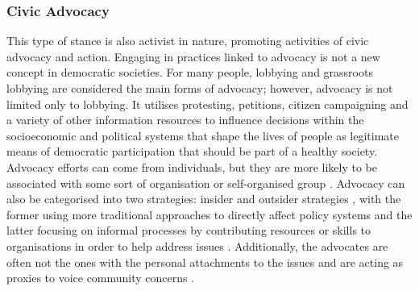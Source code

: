 \subsubsection{Civic Advocacy}
\label{civic-advocacy}
This type of stance is also activist in nature, promoting activities of civic advocacy and action. Engaging in practices linked to advocacy is not a new concept in democratic societies. For many people, lobbying and grassroots lobbying are considered the main forms of advocacy; however, advocacy is not limited only to lobbying. It utilises protesting, petitions, citizen campaigning and a variety of other information resources to influence decisions within the socioeconomic and political systems that shape the lives of people \citep{christoffel_public_2000} as legitimate means of democratic participation that should be part of a healthy society.
Advocacy efforts can come from individuals, but they are more likely to be associated with some sort of organisation or self-organised group \citep{leroux_nonprofits_2007,suarez_nonprofit_2009,prakash_advocacy_2010,obar_advocacy_2012}. Advocacy can also be categorised into two strategies: insider and outsider strategies \citep{asad_tap_2017}, with the former using more traditional approaches to directly affect policy systems and the latter focusing on informal processes by contributing resources or skills to organisations in order to help address issues \citep{hackler_strategic_2007,erete_storytelling_2016,marshall_accountable:_2016}. Additionally, the advocates are often not the ones with the personal attachments to the issues and are acting as proxies to voice community concerns \citep{leroux_nonprofits_2007,voida_bridging_2012,johnson_community_2017}.

